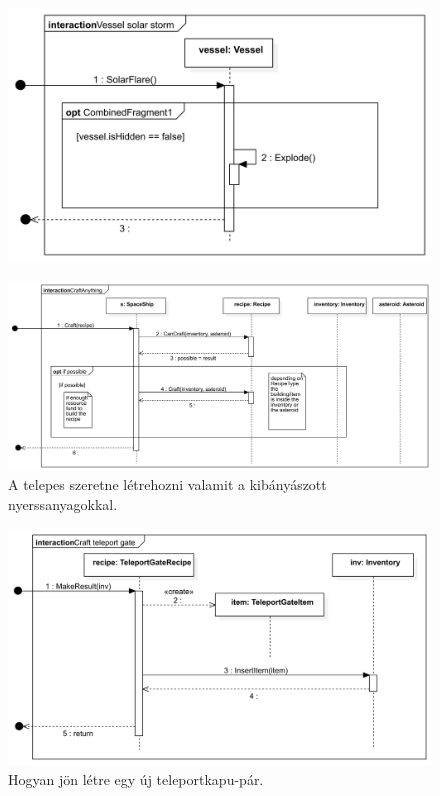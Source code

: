 \begin{figure}[H] 
\centering 
\includegraphics[width=1\textwidth]{docs/3_Project/svg/Design Model!Sun storm!Vessel solar storm!Vessel solar storm_17.png} 
\end{figure} 

\begin{figure}[H] 
\centering 
\includegraphics[width=1\textwidth]{docs/3_Project/svg/Design Model!Crafting!Craft!CraftAnything_18.png} 
\caption{A telepes szeretne létrehozni valamit a kibányászott nyerssanyagokkal.} 
\end{figure} 

\begin{figure}[H] 
\centering 
\includegraphics[width=1\textwidth]{docs/3_Project/svg/Design Model!Crafting!Craft teleport gate!Craft teleport gate_19.png} 
\caption{Hogyan jön létre egy új teleportkapu-pár.} 
\end{figure} 


